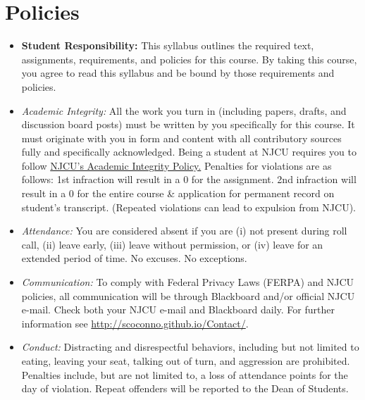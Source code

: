 \documentclass[article,oneside]{memoir}
\begin{document}
\section{Policies}

\begin{itemize}

\item \textbf{Student Responsibility:} This syllabus outlines the required text, assignments, requirements, and policies for this course. By taking this course, you agree to read this syllabus and be bound by those requirements and policies. 

 \item \textit{Academic Integrity:} All the work you turn in (including papers, drafts, and discussion board posts) must be written by you specifically for this course. It must originate with you in form and content with all contributory sources fully and specifically acknowledged. Being a student at NJCU requires you to follow \href{http://www.njcu.edu/uploadedFiles/About_NJCU/Governance_and_Organization/University_Senate/Policies/Academic\%20INTEGRITY\%20POLICY\%20FINAL\%202-04.pdf}{NJCU's Academic Integrity Policy.} Penalties for violations are as follows: 1st infraction will result in a 0 for the assignment.  2nd infraction will result in a 0 for the entire course \& application for permanent record on student's transcript. (Repeated violations can lead to expulsion from NJCU). 

\item \textit{Attendance:} You are considered absent if you are (i) not present during roll call, (ii) leave early, (iii) leave without permission, or (iv) leave for an extended period of time. No excuses. No exceptions.







\item \textit{Communication:} To comply with Federal Privacy Laws (FERPA) and NJCU policies, all communication will be through Blackboard and/or official NJCU e-mail. Check both your NJCU e-mail and Blackboard daily. For further information see \href{http://scoconno.github.io/Contact/}{http://scoconno.github.io/Contact/}.

\item \textit{Conduct:} Distracting and disrespectful behaviors, including but not limited to eating, leaving your seat, talking out of turn, and aggression are prohibited. Penalties include, but are not limited to, a loss of attendance points for the day of violation. Repeat offenders will be reported to the Dean of Students. 


\end{itemize}
\end{document}
